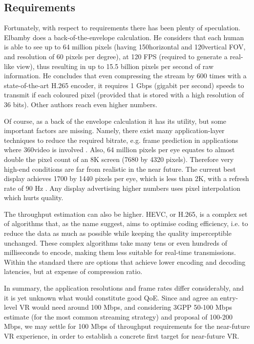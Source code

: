 \subsection*{Requirements}

Fortunately, with respect to requirements there has been plenty of speculation. Elbamby  \cite{Elbamby_towards_low_latency_vr} does a back-of-the-envelope calculation. He considers that each human is able to see up to 64 million pixels (having 150\tdeg horizontal and 120\tdeg vertical \ac{FOV}, and resolution of 60 pixels per degree), at 120 \ac{FPS} (required to generate a real-like view), thus resulting in up to 15.5 billion pixels per second of raw information. He concludes that even compressing the stream by 600 times with a state-of-the-art H.265 encoder, it requires 1 Gbps (gigabit per second) speeds to transmit if each coloured pixel (provided that is stored with a high resolution of 36 bits). Other authors \cite{bastug_towards_interconnected_vr} reach even higher numbers.

Of course, as a back of the envelope calculation it has its utility, but some important factors are missing. Namely, there exist many application-layer techniques to reduce the required bitrate, e.g. frame prediction in applications where 360\tdeg video is involved \cite{frame_prediction}. Also, 64 million pixels per eye equates to almost double the pixel count of an 8K screen (7680 by 4320 pixels). Therefore very high-end conditions are far from realistic in the near future. The current best display achieves 1700 by 1440 pixels per eye, which is less than 2K, with a refresh rate of 90 Hz \cite{vive_cosmos_elite}. Any display advertising higher numbers uses pixel interpolation \cite{pimax} which hurts quality.

The throughput estimation can also be higher. \ac{HEVC}, or H.265, is a complex set of algorithms that, as the name suggest, aims to optimise coding efficiency, i.e. to reduce the data as much as possible while keeping the quality imperceptible unchanged. These complex algorithms take many tens or even hundreds of milliseconds to encode, making them less suitable for real-time transmissions. Within the standard there are options that achieve lower encoding and decoding latencies, but at expense of compression ratio.

In summary, the application resolutions and frame rates differ considerably, and it is yet unknown what would constitute good \ac{QoE}. Since \cite{Elbamby_towards_low_latency_vr} and \cite{vr_on_the_edge} agree an entry-level VR would need around 100 Mbps, and considering \ac{3GPP} \cite{3GPP_xr} 50-100 Mbps estimate (for the most common streaming strategy) and \cite{bastug_towards_interconnected_vr} proposal of 100-200 Mbps, we may settle for 100 Mbps of throughput requirements for the near-future VR experience, in order to establish a concrete first target for near-future VR.

